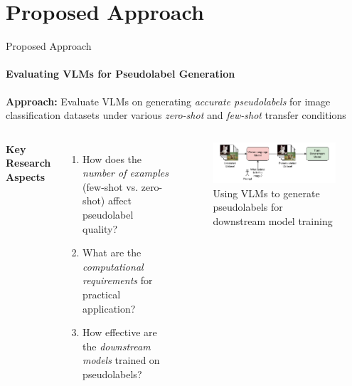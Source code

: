 \section{Proposed Approach}
\begin{frame}{Proposed Approach}
\framesubtitle{Evaluating VLMs for Pseudolabel Generation}
  \textbf{Approach:} Evaluate VLMs on generating \emph{accurate pseudolabels} for image classification datasets under various \emph{zero-shot} and \emph{few-shot} transfer conditions
  \vspace{0.3em}
    
  \begin{columns}[T]
      \centering \textbf{Key Research Aspects}
      \begin{enumerate}
        \item How does the \emph{number of examples} (few-shot vs. zero-shot) affect pseudolabel quality?
        \item What are the \emph{computational requirements} for practical application?
        \item How effective are the \emph{downstream models} trained on pseudolabels?
      \end{enumerate}

    \begin{figure}
      \includegraphics[width=\textwidth]{figures/vlm_transfer_downstream.pdf}
      \caption{\centering Using VLMs to generate pseudolabels for downstream model training}
    \end{figure}
  \end{columns}
\end{frame}


